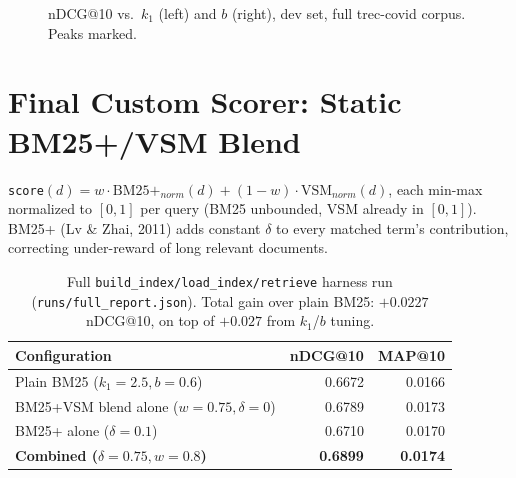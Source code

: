 \documentclass[10pt]{article}
\begin{document}
\begin{figure}[h]
\centering
\begin{minipage}{0.49\textwidth}
\end{minipage}
\hfill
\begin{minipage}{0.49\textwidth}
\end{minipage}
\caption{nDCG@10 vs.\ $k_1$ (left) and $b$ (right), dev set, full trec-covid corpus. Peaks marked.}
\end{figure}

\section{Final Custom Scorer: Static BM25+/VSM Blend}
\texttt{score}$(d) = w\cdot\text{BM25+}_{norm}(d) + (1-w)\cdot\text{VSM}_{norm}(d)$, each min-max normalized to $[0,1]$ per query (BM25 unbounded, VSM already in $[0,1]$). BM25+ (Lv \& Zhai, 2011) adds constant $\delta$ to every matched term's contribution, correcting under-reward of long relevant documents.

\begin{table}[h]
\centering\small
\begin{tabular}{lrr}
\toprule
Configuration & nDCG@10 & MAP@10 \\
\midrule
Plain BM25 ($k_1{=}2.5,b{=}0.6$) & 0.6672 & 0.0166 \\
BM25+VSM blend alone ($w{=}0.75,\delta{=}0$) & 0.6789 & 0.0173 \\
BM25+ alone ($\delta{=}0.1$) & 0.6710 & 0.0170 \\
\textbf{Combined ($\delta{=}0.75,w{=}0.8$)} & \textbf{0.6899} & \textbf{0.0174} \\
\bottomrule
\end{tabular}
\caption{Full \texttt{build\_index/load\_index/retrieve} harness run (\texttt{runs/full\_report.json}). Total gain over plain BM25: $+0.0227$ nDCG@10, on top of $+0.027$ from $k_1$/$b$ tuning.}
\end{table}
\end{document}
